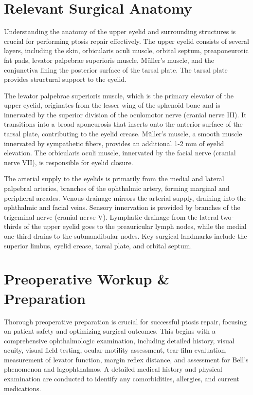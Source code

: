 \section*{Relevant Surgical Anatomy}
Understanding the anatomy of the upper eyelid and surrounding structures is crucial for performing ptosis repair effectively. The upper eyelid consists of several layers, including the skin, orbicularis oculi muscle, orbital septum, preaponeurotic fat pads, levator palpebrae superioris muscle, M\"uller's muscle, and the conjunctiva lining the posterior surface of the tarsal plate. The tarsal plate provides structural support to the eyelid.

The levator palpebrae superioris muscle, which is the primary elevator of the upper eyelid, originates from the lesser wing of the sphenoid bone and is innervated by the superior division of the oculomotor nerve (cranial nerve III). It transitions into a broad aponeurosis that inserts onto the anterior surface of the tarsal plate, contributing to the eyelid crease. M\"uller's muscle, a smooth muscle innervated by sympathetic fibers, provides an additional 1-2 mm of eyelid elevation. The orbicularis oculi muscle, innervated by the facial nerve (cranial nerve VII), is responsible for eyelid closure. 

The arterial supply to the eyelids is primarily from the medial and lateral palpebral arteries, branches of the ophthalmic artery, forming marginal and peripheral arcades. Venous drainage mirrors the arterial supply, draining into the ophthalmic and facial veins. Sensory innervation is provided by branches of the trigeminal nerve (cranial nerve V). Lymphatic drainage from the lateral two-thirds of the upper eyelid goes to the preauricular lymph nodes, while the medial one-third drains to the submandibular nodes. Key surgical landmarks include the superior limbus, eyelid crease, tarsal plate, and orbital septum.

\section*{Preoperative Workup \& Preparation}
Thorough preoperative preparation is crucial for successful ptosis repair, focusing on patient safety and optimizing surgical outcomes. This begins with a comprehensive ophthalmologic examination, including detailed history, visual acuity, visual field testing, ocular motility assessment, tear film evaluation, measurement of levator function, margin reflex distance, and assessment for Bell's phenomenon and lagophthalmos. A detailed medical history and physical examination are conducted to identify any comorbidities, allergies, and current medications.

